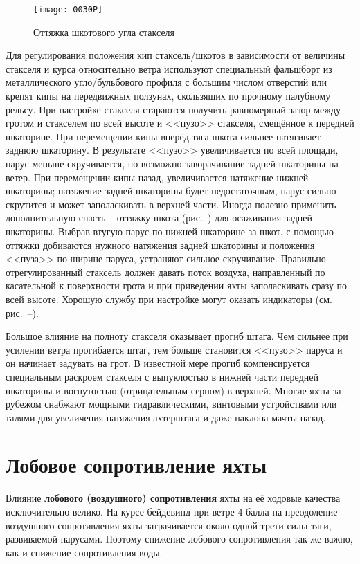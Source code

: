 \begin{figure}[htb]
  \centering
  \texttt{[image: 0030P]}
  \caption{Оттяжка шкотового угла стакселя}
  \label{fig:30}
\end{figure}

Для регулирования положения кип стаксель\-/шкотов в зависимости от
величины стакселя и курса относительно ветра используют специальный
фальшборт из металлического угло\-/бульбового профиля с большим числом
отверстий или крепят кипы на передвижных ползунах, скользящих по
прочному палубному рельсу. При настройке стакселя стараются получить
равномерный зазор между гротом и стакселем по всей высоте и <<пузо>>
стакселя, смещённое к передней шкаторине. При перемещении кипы вперёд
тяга шкота сильнее натягивает заднюю шкаторину. В результате <<пузо>>
увеличивается по всей площади, парус меньше скручивается, но возможно
заворачивание задней шкаторины на ветер. При перемещении кипы назад,
увеличивается натяжение нижней шкаторины; натяжение задней шкаторины
будет недостаточным, парус сильно скрутится и может заполаскивать в
верхней части. Иногда полезно применить дополнительную снасть \---
оттяжку шкота (рис.~) для осаживания задней шкаторины. Выбрав
втугую парус по нижней шкаторине за шкот, с помощью оттяжки добиваются
нужного натяжения задней шкаторины и положения <<пуза>> по ширине
паруса, устраняют сильное скручивание. Правильно отрегулированный
стаксель должен давать поток воздуха, направленный по касательной к
поверхности грота и при приведении яхты заполаскивать сразу по всей
высоте. Хорошую службу при настройке могут оказать индикаторы
(см. рис.~--).

Большое влияние на полноту стакселя оказывает прогиб штага. Чем
сильнее при усилении ветра прогибается штаг, тем больше становится
<<пузо>> паруса и он начинает задувать на грот. В известной мере
прогиб компенсируется специальным раскроем стакселя с выпуклостью в
нижней части передней шкаторины и вогнутостью (отрицательным серпом) в
верхней. Многие яхты за рубежом снабжают мощными гидравлическими,
винтовыми устройствами или талями для увеличения натяжения ахтерштага
и даже наклона мачты назад.

\section{Лобовое сопротивление яхты}

Влияние \textbf{лобового (воздушного) сопротивления}
  яхты на
её ходовые качества исключительно велико. На курсе бейдевинд при ветре
4 балла на преодоление воздушного сопротивления яхты затрачивается
около одной трети силы тяги, развиваемой парусами. Поэтому снижение
лобового сопротивления так же важно, как и снижение сопротивления
воды.

